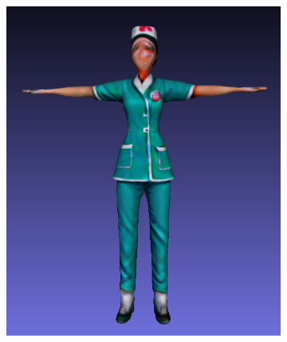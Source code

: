 \begin{figure}[H]
\begin{subfigure}[b]{0.26\textwidth}
        \includegraphics[width=\textwidth]{etc/bias/bias_nurse_genie_3.png}
        \caption{}
    \end{subfigure}
    \begin{subfigure}[b]{0.232\textwidth}
        \centering

\end{subfigure}
\end{figure}
